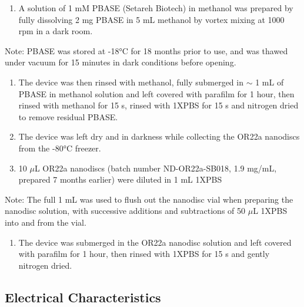 \documentclass[
  a4paper,
]{scrbook}
\providecommand{\tightlist}{%
  \setlength{\itemsep}{0pt}\setlength{\parskip}{0pt}}\usepackage{longtable,booktabs,array}
\begin{document}
\begin{enumerate}
\def\labelenumi{\arabic{enumi}.}
\setcounter{enumi}{2}
\tightlist
\item
  A solution of 1 mM PBASE (Setareh Biotech) in methanol was prepared by
  fully dissolving 2 mg PBASE in 5 mL methanol by vortex mixing at 1000
  rpm in a dark room.
\end{enumerate}

Note: PBASE was stored at -18°C for 18 months prior to use, and was
thawed under vacuum for 15 minutes in dark conditions before opening.

\begin{enumerate}
\def\labelenumi{\arabic{enumi}.}
\setcounter{enumi}{3}
\item
  The device was then rinsed with methanol, fully submerged in \(\sim\)
  1 mL of PBASE in methanol solution and left covered with parafilm for
  1 hour, then rinsed with methanol for 15 s, rinsed with 1XPBS for 15 s
  and nitrogen dried to remove residual PBASE.
\item
  The device was left dry and in darkness while collecting the OR22a
  nanodiscs from the -80°C freezer.
\item
  10 \(\mu\)L OR22a nanodiscs (batch number ND-OR22a-SB018, 1.9 mg/mL,
  prepared 7 months earlier) were diluted in 1 mL 1XPBS
\end{enumerate}

Note: The full 1 mL was used to flush out the nanodisc vial when
preparing the nanodisc solution, with successive additions and
subtractions of 50 \(\mu\)L 1XPBS into and from the vial.

\begin{enumerate}
\def\labelenumi{\arabic{enumi}.}
\setcounter{enumi}{6}
\tightlist
\item
  The device was submerged in the OR22a nanodisc solution and left
  covered with parafilm for 1 hour, then rinsed with 1XPBS for 15 s and
  gently nitrogen dried.
\end{enumerate}

\hypertarget{electrical-characteristics}{%
\subsection{Electrical
Characteristics}\label{electrical-characteristics}}
\end{document}
